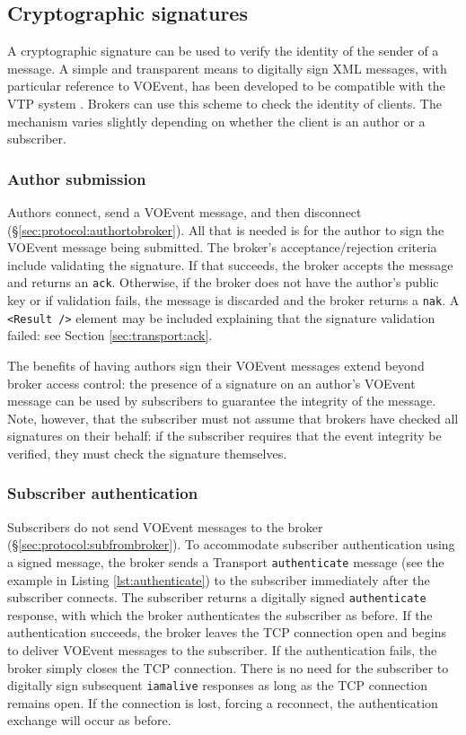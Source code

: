 \documentclass[a4paper,11pt]{ivoa}
\begin{document}
\subsection{Cryptographic signatures}
\label{sec:limit:crypto}

A cryptographic signature can be used to verify the identity of the sender of
a message. A simple and transparent means to digitally sign XML messages, with
particular reference to VOEvent, has been developed to be compatible with the
VTP system \citep{Denny:2008}. Brokers can use this scheme to check the
identity of clients. The mechanism varies slightly depending on whether the
client is an author or a subscriber.

\subsubsection{Author submission}
\label{sec:limit:crypto:author}

Authors connect, send a VOEvent message, and then disconnect
(\S\ref{sec:protocol:authortobroker}).  All that is needed is for the author
to sign the VOEvent message being submitted. The broker's acceptance/rejection
criteria include validating the signature. If that succeeds, the broker
accepts the message and returns an \texttt{ack}. Otherwise, if the broker does
not have the author's public key or if validation fails, the message is
discarded and the broker returns a \texttt{nak}. A \texttt{<Result~/>} element
may be included explaining that the signature validation failed: see Section
\ref{sec:transport:ack}.

The benefits of having authors sign their VOEvent messages extend beyond
broker access control: the presence of a signature on an author's VOEvent
message can be used by subscribers to guarantee the integrity of the message.
Note, however, that the subscriber must not assume that brokers have checked
all signatures on their behalf: if the subscriber requires that the event
integrity be verified, they must check the signature themselves.

\subsubsection{Subscriber authentication}
\label{sec:limit:crypto:subscriber}

Subscribers do not send VOEvent messages to the broker
(\S\ref{sec:protocol:subfrombroker}). To accommodate subscriber authentication
using a signed message, the broker sends a Transport \texttt{authenticate}
message (see the example in Listing \ref{lst:authenticate}) to the subscriber
immediately after the subscriber connects. The subscriber returns a digitally
signed \texttt{authenticate} response, with which the broker authenticates the
subscriber as before. If the authentication succeeds, the broker leaves the
TCP connection open and begins to deliver VOEvent messages to the subscriber.
If the authentication fails, the broker simply closes the TCP connection.
There is no need for the subscriber to digitally sign subsequent
\texttt{iamalive} responses as long as the TCP connection remains open. If the
connection is lost, forcing a reconnect, the authentication exchange will
occur as before.
\end{document}
